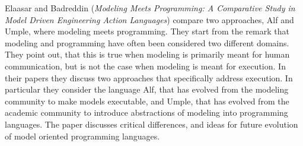 


Elaasar and Badreddin
\cite{isola-2016-elaasar}
({\em Modeling Meets Programming: A Comparative Study in
Model Driven Engineering Action Languages})
compare two approaches, Alf and Umple, where modeling meets programming. They start from the remark that modeling and programming have often been considered two different domains. They point out, that this is true when modeling is primarily meant for human communication, but is not the case when modeling is meant for execution. In their papers they discuss two approaches that specifically address execution. In particular they consider the language Alf, that has evolved from the modeling community to make models executable, and Umple, that has evolved from the academic community to introduce abstractions of modeling into programming languages. The paper discusses critical differences, and ideas for future evolution of model oriented programming languages.
 
